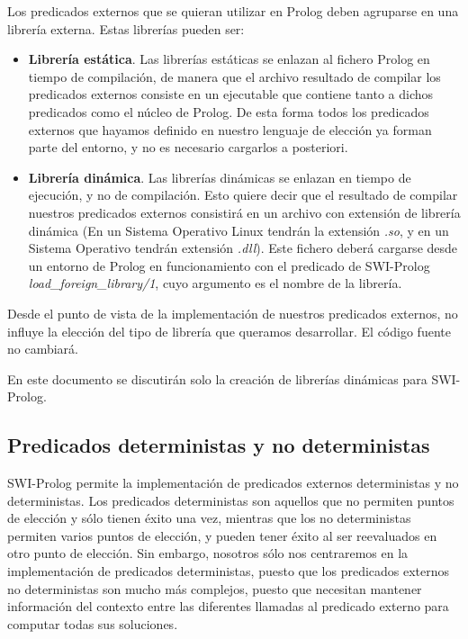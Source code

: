 \documentclass[a4paper]{article}
\begin{document}
Los predicados externos que se quieran utilizar en Prolog deben agruparse en una librería externa. Estas librerías pueden ser:

\begin{itemize}
\item \textbf{Librería estática}. Las librerías estáticas se enlazan al fichero Prolog en tiempo de compilación, de manera que el archivo resultado de compilar los predicados externos consiste en un ejecutable que contiene tanto a dichos predicados como el núcleo de Prolog. De esta forma todos los predicados externos que hayamos definido en nuestro lenguaje de elección ya forman parte del entorno, y no es necesario cargarlos a posteriori.
\item \textbf{Librería dinámica}. Las librerías dinámicas se enlazan en tiempo de ejecución, y no de compilación. Esto quiere decir que el resultado de compilar nuestros predicados externos consistirá en un archivo con extensión de librería dinámica (En un Sistema Operativo Linux tendrán la extensión \textit{.so}, y en un Sistema Operativo tendrán extensión \textit{.dll}). Este fichero deberá cargarse desde un entorno de Prolog en funcionamiento con el predicado de SWI-Prolog   \textit{load\_foreign\_library/1}, cuyo argumento es el nombre de la librería.
\end{itemize}

Desde el punto de vista de la implementación de nuestros predicados externos, no influye la elección del tipo de librería que queramos desarrollar. El código fuente no cambiará.

En este documento se discutirán solo la creación de librerías dinámicas para SWI-Prolog.
\subsection{Predicados deterministas y no deterministas}

SWI-Prolog permite la implementación de predicados externos deterministas y no deterministas. Los predicados deterministas son aquellos que no permiten puntos de elección y sólo tienen éxito una vez, mientras que los no deterministas permiten varios puntos de elección, y pueden tener éxito al ser reevaluados en otro punto de elección. Sin embargo, nosotros sólo nos centraremos en la implementación de predicados deterministas, puesto que los predicados externos no deterministas son mucho más complejos, puesto que necesitan mantener información del contexto entre las diferentes llamadas al predicado externo para computar todas sus soluciones.
\end{document}
